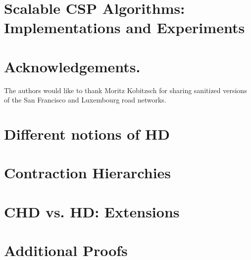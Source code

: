 \documentclass[screen,sigconf]{acmart}
\begin{document}
\section{Scalable CSP Algorithms:\texorpdfstring{\\}{ } Implementations and Experiments}
\label{sec:numeric}



\section*{Acknowledgements.}
The authors would like to thank Moritz Kobitzsch for sharing sanitized versions of the San Francisco and Luxembourg road networks.


\appendix
\section{Different notions of HD}
\label{app:generalhd}


\section{Contraction Hierarchies}


\section{CHD vs. HD: Extensions}
\label{app:extn}



\section{Additional Proofs}
\label{sec:proofs}



 
\end{document}
